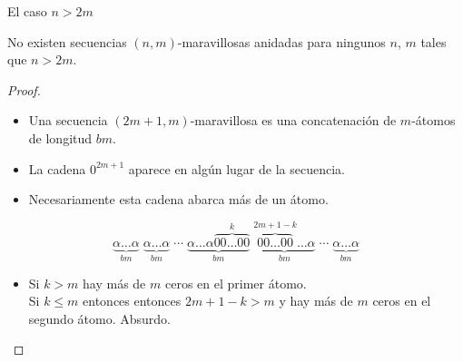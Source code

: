 \documentclass[spanish,xcolor={table}]{beamer}
\begin{document}

\begin{frame}{El caso $n > 2m$}

\begin{theorem}
  No existen secuencias $(n,m)$-maravillosas anidadas para ningunos $n$, $m$
	tales que $n > 2m$.
\end{theorem}

\begin{proof}
  \begin{itemize}
    \item Una secuencia $(2m + 1,m)$-maravillosa es una concatenación
    de $m$-átomos de longitud $bm$.
    \item La cadena $0^{2m+1}$ aparece en algún lugar de la secuencia.
    \item Necesariamente esta cadena abarca más de un átomo.
  \end{itemize}
  \[ \underbrace{\alpha\dots\alpha}_{bm}
    \; \underbrace{\alpha\dots\alpha}_{bm} \; \cdots
    \; \underbrace{\alpha\dots\alpha\overbrace{00\dots00}^{k}}_{bm}
    \; \underbrace{\overbrace{00\dots00}^{2m+1-k}\dots\alpha}_{bm} \; \cdots
    \; \underbrace{\alpha\dots\alpha}_{bm} \]
  \begin{itemize}
    \item Si $k > m$ hay más de $m$ ceros en el primer átomo. \\
    Si $k \leq m$ entonces entonces $2m + 1 - k > m$ y hay más de $m$ ceros en el segundo átomo. Absurdo. \qedhere
  \end{itemize}
\end{proof}

\end{frame}

\end{document}
